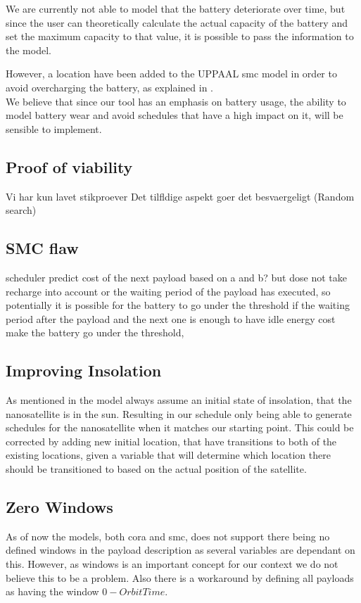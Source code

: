We are currently not able to model that the battery deteriorate over time, but since the user can theoretically calculate the actual capacity of the battery and set the maximum capacity to that value, it is possible to pass the information to the model.

However, a location have been added to the UPPAAL \gls{smc} model in order to avoid overcharging the battery, as explained in .\\

We believe that since our tool has an emphasis on battery usage, the ability to model battery wear and avoid schedules that have a high impact on it, will be sensible to implement. 


\subsection*{Proof of viability}
Vi har kun lavet stikproever
Det tilfldige aspekt goer det besvaergeligt (Random search)

\subsection*{SMC flaw}
scheduler predict cost of the next payload based on a and b? but dose not take recharge into account or the waiting period of the payload has executed, so potentially it is possible for the battery to go under the threshold if the waiting period after the payload and the next one is enough to have idle energy cost make the battery go under the threshold,  

\subsection*{Improving Insolation}
As mentioned in  the model always assume an initial state of insolation, that the nanosatellite is in the sun. Resulting in our schedule only being able to generate schedules for the nanosatellite when it matches our starting point.
This could be corrected by adding new initial location, that have transitions to both of the existing locations, given a variable that will determine which location there should be transitioned to based on the actual position of the satellite.


\subsection*{Zero Windows}
As of now the models, both \gls{cora} and \gls{smc}, does not support there being no defined windows in the payload description as several variables are dependant on this. However, as windows is an important concept for our context we do not believe this to be a problem. Also there is a workaround by defining all payloads as having the window $0-OrbitTime$.

